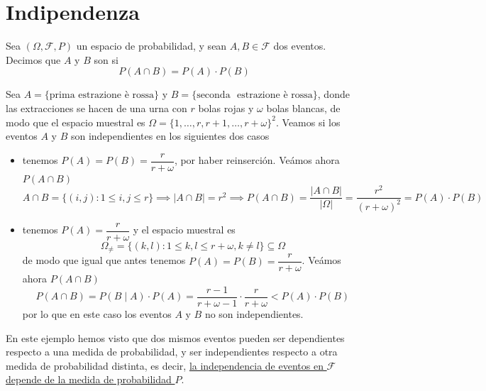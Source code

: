 \section{Indipendenza}
\begin{definicion}
    Sea $(\Omega, \mathcal{F}, P)$ un espacio de probabilidad, y sean \mbox{$A, B \in \mathcal{F}$} dos eventos. Decimos que $A$ y $B$ son  si 
    \begin{equation*}
        P(A\cap B) = P(A) \cdot P(B)
    \end{equation*}
\end{definicion}

\begin{ejemplo}
    Sea $A=\{\text{prima estrazione è rossa}\}$ y $B=\{\text{seconda } $ $\text{estrazione è rossa}\}$, donde las extracciones se hacen de una urna con $r$ bolas rojas y $\omega$ bolas blancas, de modo que el espacio muestral es $\Omega = \{1, \ldots, r, r+1, \ldots, r+\omega\}^2$. Veamos si los eventos $A$ y $B$ son independientes en los siguientes dos casos
    \begin{itemize}
        \item {} tenemos $P(A)=P(B)=\dfrac{r}{r+\omega}$, por haber reinserción. Veámos ahora $P(A\cap B)$
        \begin{equation*}
            A\cap B=\{(i,j): 1\leq i,j \leq r\} \implies |A\cap B|=r^2 \implies P(A\cap B)=\dfrac{|A\cap B|}{|\Omega|}=\dfrac{r^2}{(r+\omega)^2} = P(A) \cdot P(B)
        \end{equation*}
        \item {} tenemos $P(A)=\dfrac{r}{r+\omega}$ y el espacio muestral es
        \begin{equation*}
            \Omega_{\neq}=\{(k,l): 1\leq k,l \leq r+\omega, k\neq l\} \subseteq \Omega
        \end{equation*}
        de modo que igual que antes tenemos $P(A)=P(B)=\dfrac{r}{r+\omega}$. Veámos ahora $P(A\cap B )$
        \begin{equation*}
            P(A\cap B) = P(B\mid A) \cdot P(A) = \dfrac{r-1}{r+\omega-1} \cdot \dfrac{r}{r+\omega} < P(A) \cdot P(B)
        \end{equation*}
        por lo que en este caso los eventos $A$ y $B$ no son independientes.
    \end{itemize}
    En este ejemplo hemos visto que dos mismos eventos pueden ser dependientes respecto a una medida de probabilidad, y ser independientes respecto a otra medida de probabilidad distinta, es decir, \underline{la independencia de eventos en $\mathcal{F}$ depende de la medida de probabilidad $P$}.
\end{ejemplo}

